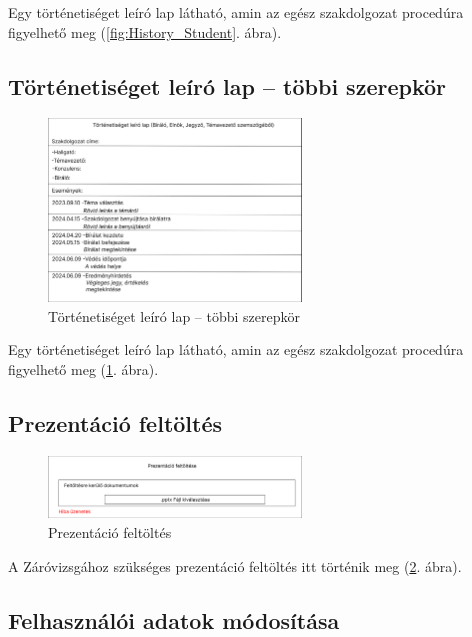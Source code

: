 \documentclass[a4paper,12pt]{article}
\begin{document}
Egy történetiséget leíró lap látható, amin az egész szakdolgozat procedúra figyelhető meg (\ref{fig:History_Student}. ábra).

\subsection{Történetiséget leíró lap -- többi szerepkör}

\begin{figure}[h!]
	\centering
	\includegraphics[width=0.6\textwidth]{images/Web_pages/History.jpg}
	\caption{Történetiséget leíró lap -- többi szerepkör}
	\label{fig:History}
\end{figure}

Egy történetiséget leíró lap látható, amin az egész szakdolgozat procedúra figyelhető meg (\ref{fig:History}. ábra).

\subsection{Prezentáció feltöltés}

\begin{figure}[h!]
	\centering
	\includegraphics[width=0.6\textwidth]{images/Web_pages/Presentation_Upload.jpg}
	\caption{Prezentáció feltöltés}
	\label{fig:Presentation_Upload}
\end{figure}

A Záróvizsgához szükséges prezentáció feltöltés itt történik meg (\ref{fig:Presentation_Upload}. ábra).

\subsection{Felhasználói adatok módosítása}
\end{document}
